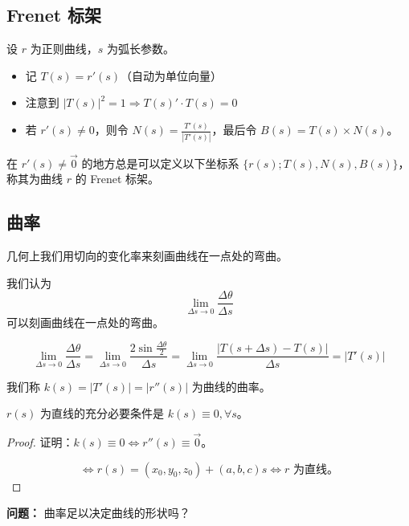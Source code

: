 \documentclass[lang=cn,10pt,thmcnt=section]{elegantbook}
\begin{document}
\subsection{Frenet 标架}
\begin{definition}[Frenet 标架]
    设 $r$ 为正则曲线，$s$ 为弧长参数。
    \begin{itemize}
        \item 记 $T(s) = r'(s)$（自动为单位向量）
        \item 注意到 $|T(s)|^2 = 1 \Rightarrow T(s)' \cdot T(s) = 0$
        \item 若 $r'(s) \neq 0$，则令 $N(s) = \frac{T'(s)}{|T'(s)|}$，最后令 $B(s) = T(s) \times N(s)$。
    \end{itemize}
    在 $r'(s) \neq \vec{0}$ 的地方总是可以定义以下坐标系 $\{r(s); T(s), N(s), B(s)\}$，称其为曲线 $r$ 的 Frenet 标架。
\end{definition}
\subsection{曲率}

    几何上我们用切向的变化率来刻画曲线在一点处的弯曲。

    我们认为
    \[
    \lim_{\Delta s \to 0} \frac{\Delta \theta}{\Delta s}
    \]
    可以刻画曲线在一点处的弯曲。

    
\begin{proposition}
    \[
    \lim_{\Delta s \to 0} \frac{\Delta \theta}{\Delta s} = \lim_{\Delta s \to 0} \frac{2 \sin \frac{\Delta \theta}{2}}{\Delta s} = \lim_{\Delta s \to 0} \frac{|T(s + \Delta s) - T(s)|}{\Delta s} = |T'(s)|
    \]
\end{proposition}
\begin{definition}[曲率]
    我们称 $k(s) = |T'(s)| = |r''(s)|$ 为曲线的曲率。
    \end{definition}
    
    \begin{proposition}
    $r(s)$ 为直线的充分必要条件是 $k(s) \equiv 0, \forall s$。
    \end{proposition}
    
    \begin{proof}
    证明：$k(s) \equiv 0 \Leftrightarrow r''(s) \equiv \vec{0}$。
    
    \[
    \Leftrightarrow r(s) = (x_0, y_0, z_0) + (a, b, c)s \Leftrightarrow r \text{ 为直线}。
    \]
    \end{proof}
    
    \textbf{问题：} 曲率足以决定曲线的形状吗？
    
\end{document}
